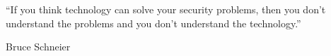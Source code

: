\documentclass[10pt, a4paper,headsepline]{scrreprt}
\begin{document}
\pagestyle{empty}





\vspace*{\fill}
\begin{center}
“If you think technology can solve your security problems, then you don’t understand the problems and you don’t understand the technology.”
\end{center}
\begin{flushright}
Bruce Schneier
\end{flushright}
\vspace*{\fill}

\clearpage%
\begingroup
  \renewcommand*{\chapterpagestyle}{empty}
  \pagestyle{empty}
  \tableofcontents
  \clearpage
\endgroup




\fancyhead[L]{\nouppercase{\leftmark}} %

\end{document}
